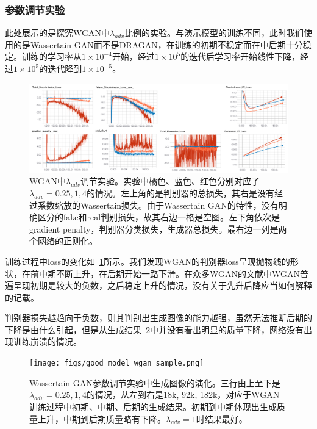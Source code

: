 \documentclass[a4paper,12pt,UTF8]{ctexart}
\newcommand{\kai}{\CJKfamily{zhkai}}	%
\begin{document}
\subsubsection{参数调节实验}

此处展示的是探究WGAN中$\lambda_{adv}$比例的实验。与演示模型的训练不同，此时我们使用的是Wassertain GAN而不是DRAGAN，在训练的初期不稳定而在中后期十分稳定。训练的学习率从$1 \times 10^{-4}$开始，经过$1 \times 10^{5}$的迭代后学习率开始线性下降，经过$1 \times 10^{5}$的迭代降到$1 \times 10^{-5}$。

\begin{figure}[H]
  \centering
  \includegraphics[width=1\linewidth]{figs/good_model_wgan.png}
  \caption{\kai WGAN中$\lambda_{adv}$调节实验。实验中橘色、蓝色、红色分别对应了$\lambda_{adv}=0.25, 1, 4$的情况。左上角的是判别器的总损失，其右是没有经过系数缩放的Wassertain损失。由于Wassertain GAN的特性，没有明确区分的fake和real判别损失，故其右边一格是空图。左下角依次是gradient penalty，判别器分类损失，生成器总损失。最右边一列是两个网络的正则化。}
  \label{fig:goodmodel_wgan}
\end{figure}

训练过程中loss的变化如~\ref{fig:goodmodel_wgan}所示。我们发现WGAN的判别器loss呈现抛物线的形状，在前中期不断上升，在后期开始一路下滑。在众多WGAN的文献中WGAN普遍呈现初期是较大的负数，之后稳定上升的情况，没有关于先升后降应当如何解释的记载。

判别器损失越趋向于负数，则其判别出生成图像的能力越强，虽然无法推断后期的下降是由什么引起，但是从生成结果~\ref{fig:wgan_evolve}中并没有看出明显的质量下降，网络没有出现训练崩溃的情况。

\begin{figure}[H]
  \centering
  \texttt{[image: figs/good\_model\_wgan\_sample.png]}
  \caption{\kai Wassertain GAN参数调节实验中生成图像的演化。三行由上至下是$\lambda_{adv}=0.25, 1, 4$的情况，从左到右是18k, 92k, 182k，对应于WGAN训练过程中初期、中期、后期的生成结果。初期到中期体现出生成质量上升，中期到后期质量略有下降。$\lambda_{adv}=1$时结果最好。}
  \label{fig:wgan_evolve}
\end{figure}
\end{document}
